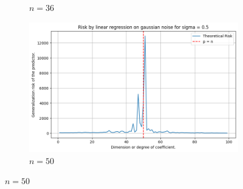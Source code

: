 \documentclass{article}
\begin{document}
\begin{figure}[htb]
\begin{subfigure}[b]{\imgwidth}
    \caption{$n=36$}\label{fig:1c2}
  \end{subfigure}%
  \hfill
  \begin{subfigure}[b]{\imgwidth}
    \includegraphics[width=\linewidth]{img/descent_devel4.png}
    \caption{$n=50$}\label{fig:1d2}
  \end{subfigure}

  \medskip


\end{figure}
\end{document}
